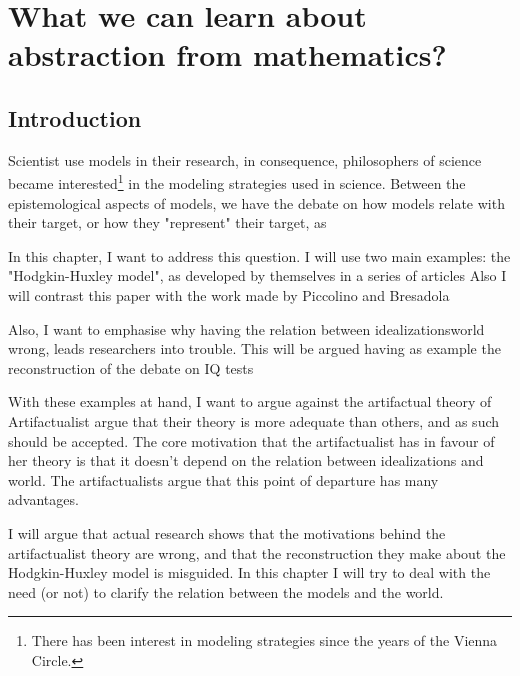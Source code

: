 
\chapter{What we can learn about abstraction from mathematics?}

\section{Introduction}

Scientist use models in their research, in consequence, philosophers of science became interested\footnote{There has been interest in modeling strategies since the years of the Vienna Circle.} in the modeling strategies used in science.
Between the epistemological aspects of models, we have the debate on how models relate with their target, or how they "represent" their target, as %

In this chapter, I want to address this question.
I will use two main examples: the "Hodgkin-Huxley model", as developed by themselves in a series of articles %
Also I will contrast this paper with the work made by Piccolino and Bresadola%

Also, I want to emphasise why having the relation between idealizations\/world wrong, leads researchers into trouble.
This will be argued having as example the reconstruction of the debate on IQ tests%

With these examples at hand, I want to argue against the artifactual theory of %
Artifactualist argue that their theory is more adequate than others, and as such should be accepted.
The core motivation that the artifactualist has in favour of her theory is that it doesn't depend on the relation between idealizations and world.
The artifactualists argue that this point of departure has many advantages.

I will argue that actual research shows that the motivations behind the artifactualist theory are wrong, and that the reconstruction they make about the Hodgkin-Huxley model is misguided.
In this chapter I will try to deal with the need (or not) to clarify the relation between the models and the world.

